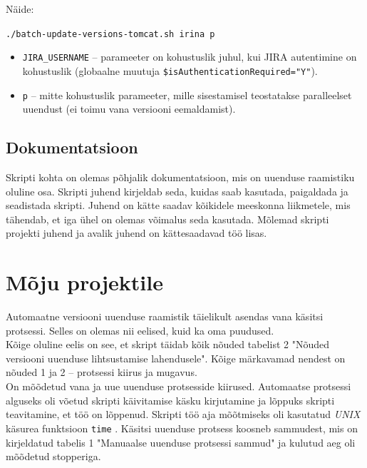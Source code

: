 \documentclass[12pt]{report}
\newcommand{\code}[1]{\texttt{#1}}
\begin{document}
  Näide:
  \begin{center}
    \small{\code{./batch-update-versions-tomcat.sh irina p}}
  \end{center}
  
  \begin{itemize}
    \item \code{JIRA\_USERNAME} \--- parameeter on kohustuslik juhul, kui JIRA autentimine on kohustuslik (globaalne muutuja \code{\$isAuthenticationRequired="Y"}).
    \item \code{p} \--- mitte kohustuslik parameeter, mille sisestamisel teostatakse paralleelset uuendust (ei toimu vana versiooni eemaldamist).
  \end{itemize}

  \subsection{Dokumentatsioon}
  
  Skripti kohta on olemas põhjalik dokumentatsioon, mis on uuenduse raamistiku oluline osa. Skripti juhend kirjeldab seda, kuidas saab kasutada, paigaldada ja seadistada skripti. Juhend on kätte saadav kõikidele meeskonna liikmetele, mis tähendab, et iga ühel on olemas võimalus seda kasutada. Mõlemad skripti projekti juhend ja avalik juhend on kättesaadavad töö lisas.
  
  \newpage
  
  \section{Mõju projektile}
  
  Automaatne versiooni uuenduse raamistik täielikult asendas vana käsitsi protsessi. Selles on olemas nii eelised, kuid ka oma puudused.\\
  
  Kõige oluline eelis on see, et skript täidab kõik nõuded tabelist 2 "Nõuded versiooni uuenduse lihtsustamise lahendusele". Kõige märkavamad nendest on nõuded 1 ja 2 \--- protsessi kiirus ja mugavus.\\
  
  On mõõdetud vana ja uue uuenduse protsesside kiirused. Automaatse protsessi alguseks oli võetud skripti käivitamise käsku kirjutamine ja lõppuks skripti teavitamine, et töö on lõppenud. Skripti töö aja mõõtmiseks oli kasutatud \textit{UNIX} käsurea funktsioon \code{time} \cite{time}. Käsitsi uuenduse protsess koosneb sammudest, mis on kirjeldatud tabelis 1 "Manuaalse uuenduse protsessi sammud" ja kulutud aeg oli mõõdetud stopperiga.\\
  
\end{document}
